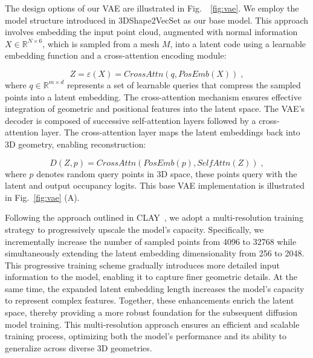 The design options of our VAE are illustrated in Fig.~~\ref{fig:vae}. We employ the model structure introduced in 3DShape2VecSet as our base model. This approach involves embedding the input point cloud, augmented with normal information $X \in \mathbb{R}^{N \times 6} $, which is sampled from a mesh $M$, into a latent code using a learnable embedding function and a cross-attention encoding module:

\begin{equation}
Z = \varepsilon(X) = CrossAttn(q, PosEmb(X)) \;,
\end{equation}
where $q \in \mathbb{R}^{m \times d}$ represents a set of learnable queries that compress the sampled points into a latent embedding. The cross-attention mechanism ensures effective integration of geometric and positional features into the latent space. The VAE’s decoder is composed of successive self-attention layers followed by a cross-attention layer. The cross-attention layer maps the latent embeddings back into 3D geometry, enabling reconstruction:

\begin{equation}
D(Z, p) = CrossAttn(PosEmb(p), SelfAttn(Z)) \;,\label{eq:decoder}
\end{equation}
where $p$ denotes random query points in 3D space, these points query with the latent and output occupancy logits.
This base VAE implementation is illustrated in Fig.~\ref{fig:vae} (A).


Following the approach outlined in CLAY~\cite{zhang2024clay}, we adopt a multi-resolution training strategy to progressively upscale the model's capacity. Specifically, we incrementally increase the number of sampled points from 4096 to 32768 while simultaneously extending the latent embedding dimensionality from 256 to 2048. This progressive training scheme gradually introduces more detailed input information to the model, enabling it to capture finer geometric details. At the same time, the expanded latent embedding length increases the model’s capacity to represent complex features. Together, these enhancements enrich the latent space, thereby providing a more robust foundation for the subsequent diffusion model training. This multi-resolution approach ensures an efficient and scalable training process, optimizing both the model's performance and its ability to generalize across diverse 3D geometries.


